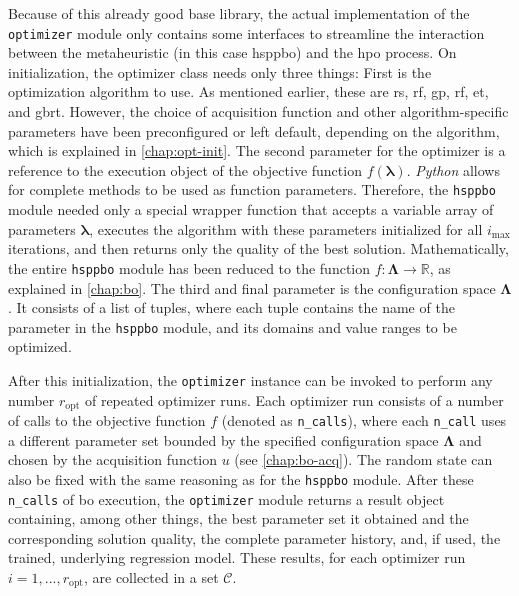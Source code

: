 Because of this already good base library, the actual implementation of the \texttt{optimizer} module only contains some interfaces to streamline the interaction between the metaheuristic (in this case \gls{hsppbo}) and the \gls{hpo} process. On initialization, the optimizer class needs only three things: 
First is the optimization algorithm to use. As mentioned earlier, these are \glsdesc{rs}, \glsdesc{rf}, \glsdesc{gp}, \glsdesc{rf}, \glsdesc{et}, and \glsdesc{gbrt}. However, the choice of acquisition function and other algorithm-specific parameters have been preconfigured or left default, depending on the algorithm, which is explained in \cref{chap:opt-init}.
The second parameter for the optimizer is a reference to the execution object of the objective function $f(\mathbf{\lambda})$. \textit{Python} allows for complete methods to be used as function parameters. Therefore, the \texttt{hsppbo} module needed only a special wrapper function that accepts a variable array of parameters $\mathbf{\lambda}$, executes the algorithm with these parameters initialized for all $i_{\text{max}}$ iterations, and then returns only the quality of the best solution. Mathematically, the entire \texttt{hsppbo} module has been reduced to the function $f: \mathcal{\mathbf{\Lambda}} \to \mathbb{R}$, as explained in \cref{chap:bo}.
The third and final parameter is the configuration space $\mathcal{\mathbf{\Lambda}}$. It consists of a list of tuples, where each tuple contains the name of the parameter in the \texttt{hsppbo} module, and its domains and value ranges to be optimized.

After this initialization, the \texttt{optimizer} instance can be invoked to perform any number $r_{\text{opt}}$ of repeated optimizer runs. Each optimizer run consists of a number of calls to the objective function $f$ (denoted as \texttt{n\_calls}), where each \texttt{n\_call} uses a different parameter set bounded by the specified configuration space $\mathcal{\mathbf{\Lambda}}$ and chosen by the acquisition function $u$ (see \cref{chap:bo-acq}). The random state can also be fixed with the same reasoning as for the \texttt{hsppbo} module. After these \texttt{n\_calls} of \gls{bo} execution, the \texttt{optimizer} module returns a result object containing, among other things, the best parameter set it obtained and the corresponding solution quality, the complete parameter history, and, if used, the trained, underlying regression model. These results, for each optimizer run $i =1,...,r_{\text{opt}}$, are collected in a set $\mathcal{C}$.


